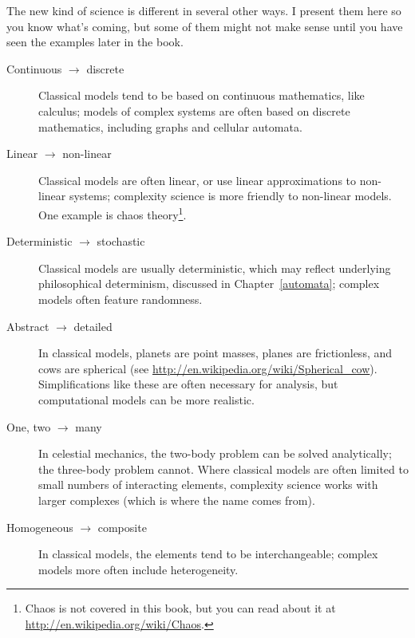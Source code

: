 \documentclass[10pt]{book}
\begin{document}
The new kind of science is different in several other
ways.  I present them here so you know what's coming, but some of them
might not make sense until you have seen the examples later in the
book.

\begin{description}

\item[Continuous $\rightarrow$ discrete] Classical models tend to be
  based on continuous mathematics, like calculus; models of complex
  systems are often based on discrete mathematics, including graphs and
  cellular automata.

\item[Linear $\rightarrow$ non-linear] Classical models are often
  linear, or use linear approximations to non-linear systems;
  complexity science is more friendly to non-linear models.  One example
  is chaos theory\footnote{Chaos is not covered in this book, but you can
  read about it at \url{http://en.wikipedia.org/wiki/Chaos}.}.

\item[Deterministic $\rightarrow$ stochastic] Classical models are
  usually deterministic, which may reflect underlying philosophical
  determinism, discussed in Chapter~\ref{automata}; complex models
  often feature randomness.

\item[Abstract $\rightarrow$ detailed] In classical models, planets are
  point masses, planes are frictionless, and cows are
  spherical (see \url{http://en.wikipedia.org/wiki/Spherical_cow}).
  Simplifications like these are often necessary for analysis,
  but computational models can be more realistic.

\item[One, two $\rightarrow$ many] In celestial mechanics, the
  two-body problem can be solved analytically; the three-body problem
  cannot.  Where classical models are often limited to
  small numbers of interacting elements, complexity science works with
  larger complexes (which is where the name comes from).

\item[Homogeneous $\rightarrow$ composite] In classical models, the
  elements tend to be interchangeable; complex models more often
  include heterogeneity.

\end{description}
\end{document}
